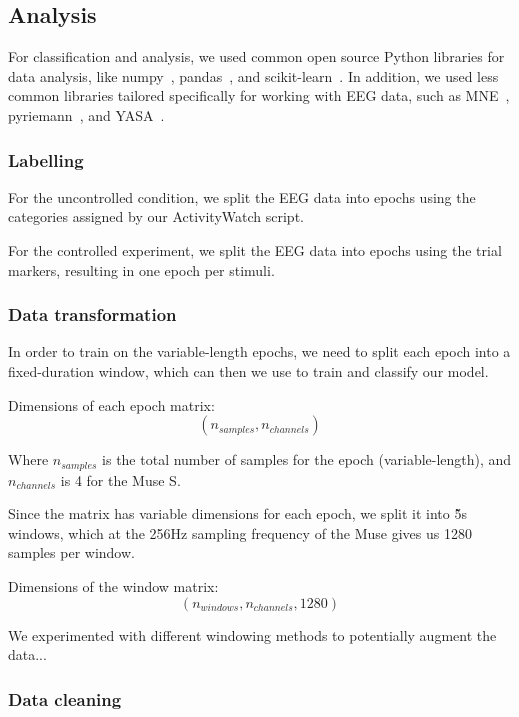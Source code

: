 \subsection{Analysis}

    For classification and analysis, we used common open source Python libraries for data analysis, like numpy~\cite{harris2020array}, pandas~\cite{reback2020pandas}, and scikit-learn~\cite{scikit-learn}. In addition, we used less common libraries tailored specifically for working with EEG data, such as MNE~\cite{noauthor_mne-python_2020}, pyriemann~\cite{alexandre_barachant_2020_3715511}, and YASA~\cite{vallat_yasa_2020}.

    \subsubsection{Labelling}
        For the uncontrolled condition, we split the EEG data into epochs using the categories assigned by our ActivityWatch script.

        For the controlled experiment, we split the EEG data into epochs using the trial markers, resulting in one epoch per stimuli.

    \subsubsection{Data transformation}

        In order to train on the variable-length epochs, we need to split each epoch into a fixed-duration window, which can then we use to train and classify our model.

        Dimensions of each epoch matrix: \[ (n_{samples}, n_{channels}) \]

        Where $n_{samples}$ is the total number of samples for the epoch (variable-length), and $n_{channels}$ is 4 for the Muse S.

        Since the matrix has variable dimensions for each epoch, we split it into \~5s windows, which at the 256Hz sampling frequency of the Muse gives us 1280 samples per window.

        Dimensions of the window matrix: \[ (n_{windows}, n_{channels}, 1280) \]

        We experimented with different windowing methods to potentially augment the data...  

    \subsubsection{Data cleaning}


